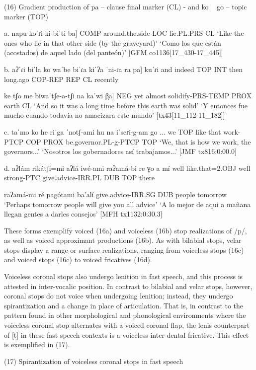 (16)	Gradient production of pa – clause final marker (CL) - and ko ~ go – topic marker (TOP)

a.	napu 	koˈɾi-ki 		biˈti 		ba]
 	COMP	around.the.side-LOC	lie.PL.PRS	CL
	‘Like the ones who lie in that other side (by the graveyard)’
	‘Como los que están (acostados) de aquel lado (del panteón)’
	[GFM co1136[17\_430-17\_445]]

b.	aʔˈɾi 	biˈla 	ko 	waˈbe 	biˈɾa 	kiˈʔa 		ˈni-ɾa 		ra 	pa] 	kuˈɾi
	and		indeed	TOP	INT	then	long.ago	COP-REP	REP	CL	recently

	ke 		tʃo 	me 	biwaˈtʃe-a-tʃi 		na 	kaˈwi 	β̩a]
	NEG	yet	almost	solidify-PRS-TEMP	PROX	earth	CL
	‘And so it was a long time before this earth was solid’
	‘Y entonces fue mucho cuando todavía no amacizara este mundo’
	[tx43[11\_112-11\_182]]

c.    taˈmo 	ko 	he 	riˈga 	ˈnotʃ-ami 	hu 	na 	iˈseɾi-g-am 		go ...
we		TOP	like	that	work-PTCP	COP	PROX	be.governor.PL-g-PTCP	TOP
	‘We, that is how we work, the governors...’
	‘Nosotros los gobernadores así trabajamos...’
	[JMF tx816:0:00.0]

d.   aʔlám 	rikátʃi=mi 	aʔlá 	iwé-ami 	raʔamá-bi 		re 	ɣo 	a mí
	well	like.that=2.OBJ	well	strong-PTC	give.advice-IRR.PL	DUB	TOP	there

	raʔamá-mi 		ré 	pagótami 	ba’alí
	give.advice-IRR.SG	DUB	people		tomorrow
	‘Perhaps tomorrow people will give you all advice’
	‘A lo mejor de aqui a mañana llegan gentes a darles consejos’
	 [MFH tx1132:0:30.3]

These forms exemplify voiced (16a) and voiceless (16b) stop realizations of /p/, as well as voiced approximant productions (16b). As with bilabial stops, velar stops display a range or surface realizations, ranging from voiceless stops (16c) and voiced stops (16c) to voiced fricatives (16d).

Voiceless coronal stops also undergo lenition in fast speech, and this process is attested in inter-vocalic position. In contrast to bilabial and velar stops, however, coronal stops do not voice when undergoing lenition; instead, they undergo spirantization and a change in place of articulation. That is, in contrast to the pattern found in other morphological and phonological environments where the voiceless coronal stop alternates with a voiced coronal flap, the lenis counterpart of [t] in these fast speech contexts is a voiceless inter-dental fricative. This effect is exemplified in (17).

(17)	Spirantization of voiceless coronal stops in fast speech

